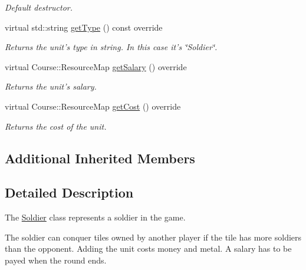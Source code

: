 \begin{DoxyCompactItemize}
\begin{DoxyCompactList}\small\item\em Default destructor. \end{DoxyCompactList}\item 
virtual std\-::string \hyperlink{class_student_1_1_soldier_a4339c81cdf40a1dba28f6fcffb555d33}{get\-Type} () const override
\begin{DoxyCompactList}\small\item\em Returns the unit's type in string. In this case it's \char`\"{}\-Soldier\char`\"{}. \end{DoxyCompactList}\item 
virtual Course\-::\-Resource\-Map \hyperlink{class_student_1_1_soldier_afdd93849bff16181910f94f769ea30fa}{get\-Salary} () override
\begin{DoxyCompactList}\small\item\em Returns the unit's salary. \end{DoxyCompactList}\item 
virtual Course\-::\-Resource\-Map \hyperlink{class_student_1_1_soldier_ac0acef7b668b9f64c8821a332e53061f}{get\-Cost} () override
\begin{DoxyCompactList}\small\item\em Returns the cost of the unit. \end{DoxyCompactList}\end{DoxyCompactItemize}
\subsection*{Additional Inherited Members}


\subsection{Detailed Description}
The \hyperlink{class_student_1_1_soldier}{Soldier} class represents a soldier in the game. 

The soldier can conquer tiles owned by another player if the tile has more soldiers than the opponent. Adding the unit costs money and metal. A salary has to be payed when the round ends. 

